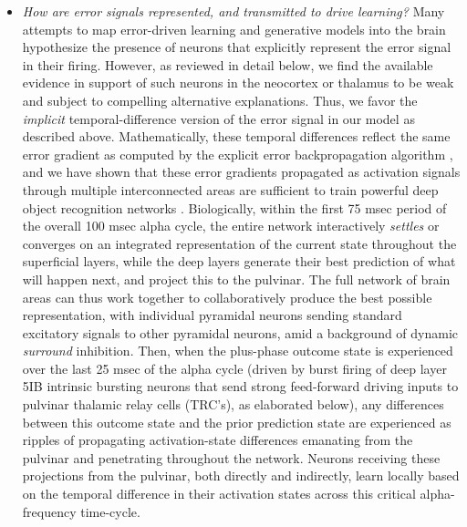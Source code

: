 \documentclass[11pt,twoside]{article}
\newif\myifpdf
\begin{document}
\begin{itemize}
\item {\em How are error signals represented, and transmitted to drive learning?}  Many attempts to map error-driven learning and generative models into the brain hypothesize the presence of neurons that explicitly represent the error signal in their firing.  However, as reviewed in detail below, we find the available evidence in support of such neurons in the neocortex or thalamus to be weak and subject to compelling alternative explanations.  Thus, we favor the {\em implicit} temporal-difference version of the error signal in our model as described above.  Mathematically, these temporal differences reflect the same error gradient as computed by the explicit error backpropagation algorithm \cite{OReilly96}, and we have shown that these error gradients propagated as activation signals through multiple interconnected areas are sufficient to train powerful deep object recognition networks \cite{OReillyWyatteHerdEtAl13,WyatteHerdMingusEtAl12,WyatteCurranOReilly12}.  Biologically, within the first 75 msec period of the overall 100 msec alpha cycle, the entire network interactively {\em settles} or converges on an integrated representation of the current state throughout the superficial layers, while the deep layers generate their best prediction of what will happen next, and project this to the pulvinar.  The full network of brain areas can thus work together to collaboratively produce the best possible representation, with individual pyramidal neurons sending standard excitatory signals to other pyramidal neurons, amid a background of dynamic {\em surround} inhibition.  Then, when the plus-phase outcome state is experienced over the last 25 msec of the alpha cycle (driven by burst firing of deep layer 5IB intrinsic bursting neurons that send strong feed-forward driving inputs to pulvinar thalamic relay cells (TRC's), as elaborated below), any differences between this outcome state and the prior prediction state are experienced as ripples of propagating activation-state differences emanating from the pulvinar and penetrating throughout the network.  Neurons receiving these projections from the pulvinar, both directly and indirectly, learn locally based on the temporal difference in their activation states across this critical alpha-frequency time-cycle.  

\end{itemize}
\end{document}
